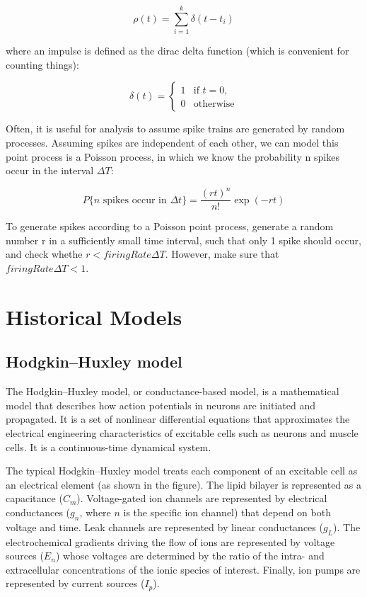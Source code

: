 \documentclass[paper=a4, fontsize=11pt]{scrartcl} %
\numberwithin{equation}{section} %
\numberwithin{figure}{section} %
\numberwithin{table}{section} %
\begin{document}
\begin{equation}
    \rho(t) = \sum_{i=1}^{k} \delta(t-t_i)
\end{equation}

where an impulse is defined as the dirac delta function (which is convenient for counting things):

\begin{equation}
    \delta(t) = \begin{cases} 1 & \text{if } t = 0, \\ 0 & \text{otherwise} \end{cases}
\end{equation}

Often, it is useful for analysis to assume spike trains are generated by random processes. Assuming spikes are independent of each other, we can model this point process is a Poisson process, in which we know the probability n spikes occur in the interval $\Delta T$:

\begin{equation}
    P\{n \text{ spikes occur in } \Delta t\} = \frac{(rt)^n}{n!} \exp(-rt)
\end{equation}

To generate spikes according to a Poisson point process, generate a random number r in a sufficiently small time interval, such that only 1 spike should occur, and check whethe $r < firingRate \Delta T$. However, make sure that $firingRate\Delta T < 1$.






\section{Historical Models}

\subsection{Hodgkin–Huxley model}

The Hodgkin–Huxley model, or conductance-based model, is a mathematical model that describes how action potentials in neurons are initiated and propagated. It is a set of nonlinear differential equations that approximates the electrical engineering characteristics of excitable cells such as neurons and muscle cells. It is a continuous-time dynamical system.

\vspace{10pt}
The typical Hodgkin–Huxley model treats each component of an excitable cell as an electrical element (as shown in the figure). The lipid bilayer is represented as a capacitance (\(C_m\)). Voltage-gated ion channels are represented by electrical conductances (\(g_n\), where \(n\) is the specific ion channel) that depend on both voltage and time. Leak channels are represented by linear conductances (\(g_L\)). The electrochemical gradients driving the flow of ions are represented by voltage sources (\(E_n\)) whose voltages are determined by the ratio of the intra- and extracellular concentrations of the ionic species of interest. Finally, ion pumps are represented by current sources (\(I_p\)).
\end{document}
